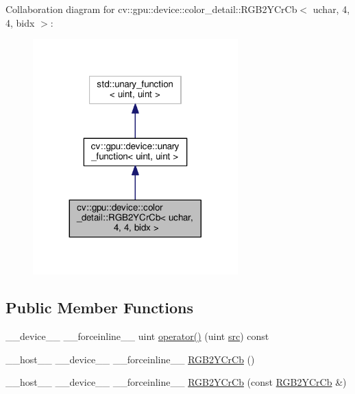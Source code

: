 Collaboration diagram for cv\-:\-:gpu\-:\-:device\-:\-:color\-\_\-detail\-:\-:R\-G\-B2\-Y\-Cr\-Cb$<$ uchar, 4, 4, bidx $>$\-:\nopagebreak
\begin{figure}[H]
\begin{center}
\leavevmode
\includegraphics[width=224pt]{structcv_1_1gpu_1_1device_1_1color__detail_1_1RGB2YCrCb_3_01uchar_00_014_00_014_00_01bidx_01_4__coll__graph}
\end{center}
\end{figure}
\subsection*{Public Member Functions}
\begin{DoxyCompactItemize}
\item 
\-\_\-\-\_\-device\-\_\-\-\_\- \-\_\-\-\_\-forceinline\-\_\-\-\_\- uint \hyperlink{structcv_1_1gpu_1_1device_1_1color__detail_1_1RGB2YCrCb_3_01uchar_00_014_00_014_00_01bidx_01_4_a4690fbd63b83e638e1979431b4b2f672}{operator()} (uint \hyperlink{legacy_8hpp_a371cd109b74033bc4366f584edd3dacc}{src}) const 
\item 
\-\_\-\-\_\-host\-\_\-\-\_\- \-\_\-\-\_\-device\-\_\-\-\_\- \-\_\-\-\_\-forceinline\-\_\-\-\_\- \hyperlink{structcv_1_1gpu_1_1device_1_1color__detail_1_1RGB2YCrCb_3_01uchar_00_014_00_014_00_01bidx_01_4_a370e33995a6ffbb1730356fce86b0d64}{R\-G\-B2\-Y\-Cr\-Cb} ()
\item 
\-\_\-\-\_\-host\-\_\-\-\_\- \-\_\-\-\_\-device\-\_\-\-\_\- \-\_\-\-\_\-forceinline\-\_\-\-\_\- \hyperlink{structcv_1_1gpu_1_1device_1_1color__detail_1_1RGB2YCrCb_3_01uchar_00_014_00_014_00_01bidx_01_4_a2a45b3a230b3cb554c4db46638dd8c1e}{R\-G\-B2\-Y\-Cr\-Cb} (const \hyperlink{structcv_1_1gpu_1_1device_1_1color__detail_1_1RGB2YCrCb}{R\-G\-B2\-Y\-Cr\-Cb} \&)
\end{DoxyCompactItemize}


